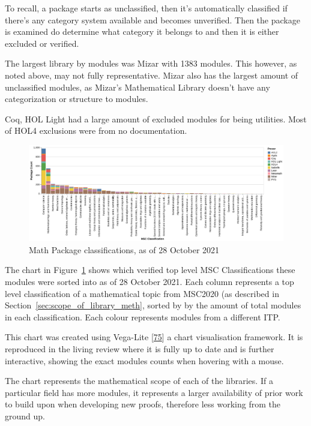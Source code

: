 \documentclass[
]{article}
\begin{document}
To recall, a package starts as unclassified, then it's automatically
classified if there's any category system available and becomes
unverified. Then the package is examined do determine what category it
belongs to and then it is either excluded or verified.

The largest library by modules was Mizar with 1383 modules. This
however, as noted above, may not fully representative. Mizar also has
the largest amount of unclassified modules, as Mizar's Mathematical
Library doesn't have any categorization or structure to modules.

Coq, HOL Light had a large amount of excluded modules for being
utilities. Most of HOL4 exclusions were from no documentation.

\begin{figure}
    \centering
    \includegraphics{./Images/MathClassification.png}
    \caption{Math Package classifications, as of 28 October 2021}
    \label{fig:math_classifications}
\end{figure}

The chart in Figure~\ref{fig:math_classifications} shows which verified
top level MSC Classifications these modules were sorted into as of 28
October 2021. Each column represents a top level classification of a
mathematical topic from MSC2020 (as described in
Section~\ref{sec:scope_of_library_meth}, sorted by by the amount of
total modules in each classification. Each colour represents modules
from a different ITP.

This chart was created using Vega-Lite
{[}\protect\hyperlink{ref-Vega-Lite}{75}{]} a chart visualisation
framework. It is reproduced in the living review where it is fully up to
date and is further interactive, showing the exact modules counts when
hovering with a mouse.

The chart represents the mathematical scope of each of the libraries. If
a particular field has more modules, it represents a larger availability
of prior work to build upon when developing new proofs, therefore less
working from the ground up.
\end{document}
